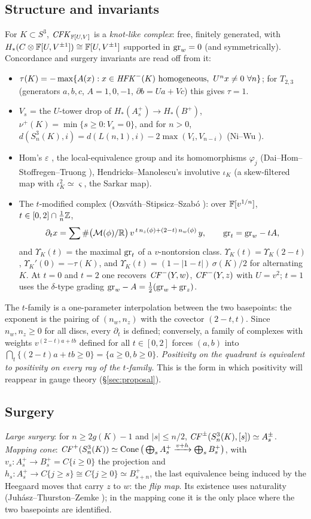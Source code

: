 \subsection{Structure and invariants}
For $K\subset S^3$, $\mathit{CFK}_{\mathbb{F}[U,V]}$ is a \emph{knot-like complex}: free, finitely generated, with
$H_*(C\otimes\mathbb{F}[U,V^{\pm1}])\cong\mathbb{F}[U,V^{\pm1}]$ supported in $\mathrm{gr}_w=0$ (and symmetrically).
Concordance and surgery invariants are read off from it:
\begin{itemize}[leftmargin=2em]
\item $\tau(K)=-\max\{A(x): x\in \HFK^-(K)\ \text{homogeneous},\ U^nx\neq0\ \forall n\}$;
for $T_{2,3}$ (generators $a,b,c$, $A=1,0,-1$, $\partial b=Ua+Vc$) this gives $\tau=1$.
\item $V_s$ = the $U$-tower drop of $H_*(A^+_s)\to H_*(B^+)$, $\nu^+(K)=\min\{s\ge0:V_s=0\}$, and
for $n>0$, $d(S^3_n(K),i)=d(L(n,1),i)-2\max(V_i,V_{n-i})$ (Ni--Wu \cite{NiWu}).
\item Hom's $\varepsilon$ \cite{Hom}, the local-equivalence group and its homomorphisms $\varphi_j$
(Dai--Hom--Stoffregen--Truong \cite{DHST}), Hendricks--Manolescu's involutive $\iota_K$ \cite{HM-inv} (a skew-filtered map with
$\iota_K^2\simeq\varsigma$, the Sarkar map).
\item The $t$-modified complex (Ozsv\'ath--Stipsicz--Szab\'o \cite{OSS}): over $\mathbb{F}[v^{1/n}]$, $t\in[0,2]\cap\frac1n\mathbb{Z}$,
\[
\partial_t x=\sum \#\big(\mathcal{M}(\phi)/\mathbb{R}\big)\, v^{\,t\,n_z(\phi)+(2-t)\,n_w(\phi)}\,y,\qquad \mathrm{gr}_t=\mathrm{gr}_w-tA,
\]
and $\Upsilon_K(t)$ = the maximal $\mathrm{gr}_t$ of a $v$-nontorsion class.  $\Upsilon_K(t)=\Upsilon_K(2-t)$,
$\Upsilon_K'(0)=-\tau(K)$, and $\Upsilon_K(t)=(1-|1-t|)\,\sigma(K)/2$ for alternating $K$.
At $t=0$ and $t=2$ one recovers $\mathit{CF}^-(Y,w)$, $\mathit{CF}^-(Y,z)$ with $U=v^2$; $t=1$ uses the
$\delta$-type grading $\mathrm{gr}_w-A=\frac12(\mathrm{gr}_w+\mathrm{gr}_z)$.
\end{itemize}
The $t$-family is a one-parameter interpolation between the two basepoints: the exponent is the
pairing of $(n_w,n_z)$ with the covector $(2-t,t)$.  Since $n_w,n_z\ge0$ for all discs, every
$\partial_t$ is defined; conversely, a family of complexes with weights $v^{(2-t)a+tb}$ defined for all
$t\in[0,2]$ forces $(a,b)$ into $\bigcap_t\{(2-t)a+tb\ge0\}=\{a\ge0,b\ge0\}$.  \emph{Positivity on the
quadrant is equivalent to positivity on every ray of the $t$-family.}  This is the form in which
positivity will reappear in gauge theory (\S\ref{sec:proposal}).

\subsection{Surgery}
\emph{Large surgery}: for $n\ge2g(K)-1$ and $|s|\le n/2$, $\mathit{CF}^\pm(S^3_n(K),[s])\simeq A^\pm_s$.
\emph{Mapping cone}: $\mathit{CF}^+(S^3_n(K))\simeq\operatorname{Cone}\big(\bigoplus_sA^+_s\xrightarrow{v+h}\bigoplus_sB^+_s\big)$,
with $v_s:A^+_s\to B^+_s=C\{i\ge0\}$ the projection and $h_s:A^+_s\to C\{j\ge s\}\cong C\{j\ge0\}\simeq B^+_{s+n}$,
the last equivalence being induced by the Heegaard moves that carry $z$ to $w$: the \emph{flip map}.
Its existence uses naturality (Juh\'asz--Thurston--Zemke \cite{JTZ}); in the mapping cone it is the only place where
the two basepoints are identified.

